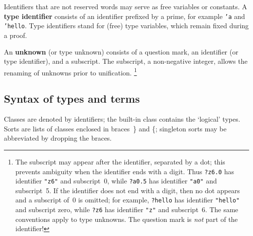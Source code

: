 Identifiers that are not reserved words may serve as free variables or
constants.  A {\bf type identifier} consists of an identifier prefixed by a
prime, for example {\tt'a} and \hbox{\tt'hello}.  Type identifiers stand
for (free) type variables, which remain fixed during a proof.

An {\bf unknown} (or type unknown) consists of a question
mark, an identifier (or type identifier), and a subscript.  The subscript,
a non-negative integer,
allows the renaming of unknowns prior to unification.%
\footnote{The subscript may appear after the identifier, separated by a
  dot; this prevents ambiguity when the identifier ends with a digit.  Thus
  {\tt?z6.0} has identifier {\tt"z6"} and subscript~0, while {\tt?a0.5}
  has identifier {\tt"a0"} and subscript~5.  If the identifier does not
  end with a digit, then no dot appears and a subscript of~0 is omitted;
  for example, {\tt?hello} has identifier {\tt"hello"} and subscript
  zero, while {\tt?z6} has identifier {\tt"z"} and subscript~6.  The same
  conventions apply to type unknowns.  The question mark is {\it not\/}
  part of the identifier!}


\subsection{Syntax of types and terms}

Classes are denoted by identifiers; the built-in class 
contains the `logical' types.  Sorts are lists of classes enclosed in
braces~\} and \{; singleton sorts may be abbreviated by dropping the braces.

